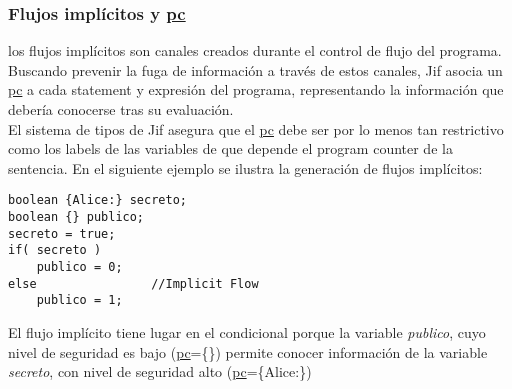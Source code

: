 \subsubsection{Flujos implícitos y \underline{pc}}
los flujos implícitos son canales creados durante el control de flujo del
programa. Buscando prevenir la fuga de información a través de estos canales,
Jif asocia un \underline{pc} a cada statement y expresión del programa,
representando la información que debería conocerse tras su evaluación.\\
El sistema de tipos de Jif asegura que el \underline{pc} debe ser por
lo menos tan restrictivo como los labels de las variables de que depende el
program counter de la sentencia.\newline
En el siguiente ejemplo se ilustra la generación de flujos implícitos:
\begin{lstlisting}[basicstyle=\scriptsize]
boolean {Alice:} secreto;
boolean {} publico;
secreto = true;
if( secreto )		
	publico = 0;
else				//Implicit Flow
	publico = 1;
\end{lstlisting}
El flujo implícito tiene lugar en el condicional porque la variable
\emph{publico}, cuyo nivel de seguridad es bajo (\underline{pc}=\{\}) permite
conocer información de la variable \emph{secreto}, con nivel de seguridad alto
(\underline{pc}=\{Alice:\})\newline
